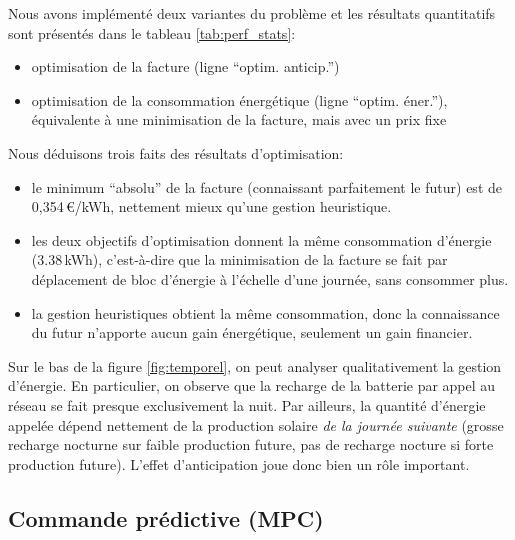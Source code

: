 \documentclass[a4paper,10pt,twocolumn]{article}
\begin{document}
Nous avons implémenté deux variantes du problème
et les résultats quantitatifs sont présentés dans le tableau \ref{tab:perf_stats}:
%
\begin{itemize}
  \item optimisation de la facture (ligne ``optim. anticip.'')
  \item optimisation de la consommation énergétique (ligne ``optim. éner.''),
  équivalente à une minimisation de la facture, mais avec un prix fixe
\end{itemize}

Nous déduisons trois faits des résultats d'optimisation:
\begin{itemize}
 \item le minimum ``absolu'' de la facture (connaissant parfaitement le futur)
 est de 0,354\,€/kWh, nettement mieux qu'une gestion heuristique.
 \item les deux objectifs d'optimisation donnent la même consommation d'énergie
 (3.38\,kWh),
 c'est-à-dire que la minimisation de la facture se fait par déplacement
 de bloc d'énergie à l'échelle d'une journée, sans consommer plus.
 \item la gestion heuristiques obtient la même consommation,
 donc la connaissance du futur n'apporte aucun gain énergétique,
 seulement un gain financier.
\end{itemize}

Sur le bas de la figure \ref{fig:temporel}, on peut analyser qualitativement
la gestion d'énergie. En particulier, on observe que la recharge de la batterie
par appel au réseau se fait presque exclusivement la nuit.
Par ailleurs, la quantité d'énergie appelée dépend nettement de la production solaire
\emph{de la journée suivante} (grosse recharge nocturne sur faible production future,
pas de recharge nocture si forte production future).
L'effet d'anticipation joue donc bien un rôle important.

\subsection{Commande prédictive (MPC)}
\label{ss:mpc}
\end{document}
